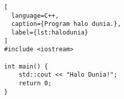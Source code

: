 \begin{lstlisting}[
  language=C++,
  caption={Program halo dunia.},
  label={lst:halodunia}
]
#include <iostream>

int main() {
    std::cout << "Halo Dunia!";
    return 0;
}
\end{lstlisting}

\lipsum[2-3]



\lipsum[4]
